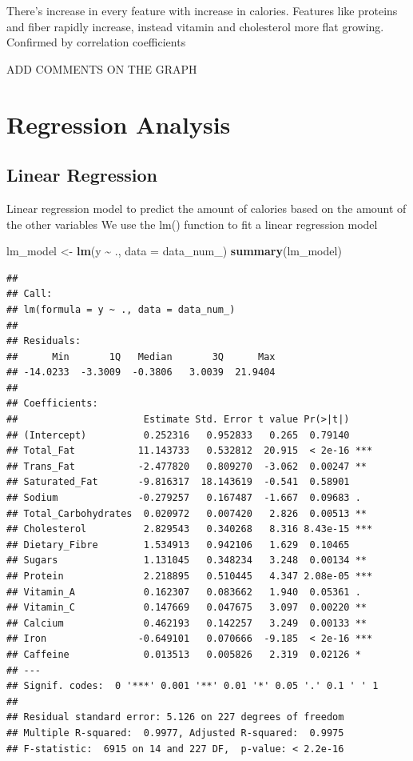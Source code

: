 \documentclass[
]{article}
\newenvironment{Shaded}{\begin{snugshade}}{\end{snugshade}}
\newcommand{\AttributeTok}[1]{\textcolor[rgb]{0.13,0.29,0.53}{#1}}
\newcommand{\FunctionTok}[1]{\textcolor[rgb]{0.13,0.29,0.53}{\textbf{#1}}}
\newcommand{\NormalTok}[1]{#1}
\newcommand{\OtherTok}[1]{\textcolor[rgb]{0.56,0.35,0.01}{#1}}
\newcommand{\SpecialCharTok}[1]{\textcolor[rgb]{0.81,0.36,0.00}{\textbf{#1}}}
\begin{document}
There's increase in every feature with increase in calories. Features
like proteins and fiber rapidly increase, instead vitamin and
cholesterol more flat growing. Confirmed by correlation coefficients

ADD COMMENTS ON THE GRAPH

\section{Regression Analysis}\label{regression-analysis}

\subsection{Linear Regression}\label{linear-regression}

Linear regression model to predict the amount of calories based on the
amount of the other variables We use the lm() function to fit a linear
regression model

\begin{Shaded}
\begin{Highlighting}[]
\NormalTok{lm\_model }\OtherTok{\textless{}{-}} \FunctionTok{lm}\NormalTok{(y }\SpecialCharTok{\textasciitilde{}}\NormalTok{ ., }\AttributeTok{data =}\NormalTok{ data\_num\_)}
\FunctionTok{summary}\NormalTok{(lm\_model)}
\end{Highlighting}
\end{Shaded}

\begin{verbatim}
## 
## Call:
## lm(formula = y ~ ., data = data_num_)
## 
## Residuals:
##      Min       1Q   Median       3Q      Max 
## -14.0233  -3.3009  -0.3806   3.0039  21.9404 
## 
## Coefficients:
##                      Estimate Std. Error t value Pr(>|t|)    
## (Intercept)          0.252316   0.952833   0.265  0.79140    
## Total_Fat           11.143733   0.532812  20.915  < 2e-16 ***
## Trans_Fat           -2.477820   0.809270  -3.062  0.00247 ** 
## Saturated_Fat       -9.816317  18.143619  -0.541  0.58901    
## Sodium              -0.279257   0.167487  -1.667  0.09683 .  
## Total_Carbohydrates  0.020972   0.007420   2.826  0.00513 ** 
## Cholesterol          2.829543   0.340268   8.316 8.43e-15 ***
## Dietary_Fibre        1.534913   0.942106   1.629  0.10465    
## Sugars               1.131045   0.348234   3.248  0.00134 ** 
## Protein              2.218895   0.510445   4.347 2.08e-05 ***
## Vitamin_A            0.162307   0.083662   1.940  0.05361 .  
## Vitamin_C            0.147669   0.047675   3.097  0.00220 ** 
## Calcium              0.462193   0.142257   3.249  0.00133 ** 
## Iron                -0.649101   0.070666  -9.185  < 2e-16 ***
## Caffeine             0.013513   0.005826   2.319  0.02126 *  
## ---
## Signif. codes:  0 '***' 0.001 '**' 0.01 '*' 0.05 '.' 0.1 ' ' 1
## 
## Residual standard error: 5.126 on 227 degrees of freedom
## Multiple R-squared:  0.9977, Adjusted R-squared:  0.9975 
## F-statistic:  6915 on 14 and 227 DF,  p-value: < 2.2e-16
\end{verbatim}
\end{document}
